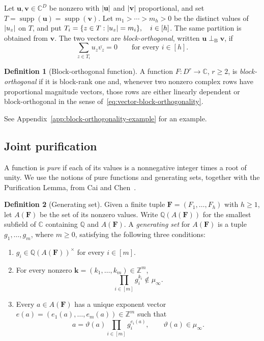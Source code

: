 \documentclass[11pt,letterpaper,onecolumn]{article}
\theoremstyle{plain}
\theoremstyle{definition}
\newtheorem{definition}[definition]{Definition}
\theoremstyle{remark}
\newcommand{\AlgNums}{\mathbb C}
\DeclareMathOperator{\supp}{supp}
\DeclarePairedDelimiter{\abs}{\lvert}{\rvert}
\begin{document}
Let $\mathbf u,\mathbf v\in\mathbb C^D$ be nonzero with $\abs{\mathbf u}$
and $\abs{\mathbf v}$ proportional, and set
$T=\supp(\mathbf u)=\supp(\mathbf v)$.  Let
$m_1>\cdots>m_h>0$ be the distinct values of $\abs{u_z}$ on $T$, and
put $T_i=\{z\in T:\abs{u_z}=m_i\},\quad i\in[h]$. The same partition is obtained from $\mathbf v$.  The two vectors are
\emph{block-orthogonal}, written
$\mathbf u\perp_{\mathrm B}\mathbf v$, if
\begin{equation}
  \sum_{z\in T_i}u_z\overline{v_z}=0
  \qquad\text{for every }i\in[h].
  \label{eq:vector-block-orthogonality}
\end{equation}

\begin{definition}[Block-orthogonal function]
\label{def:block-orthogonal-function}
A function $F:D^r\to\AlgNums$, $r\ge2$, is \emph{block-orthogonal} if it
is block-rank one and, whenever two nonzero complex rows have proportional
magnitude vectors, those rows are either linearly dependent or
block-orthogonal in the sense of~\eqref{eq:vector-block-orthogonality}.
\end{definition}

See Appendix~\ref{app:block-orthogonality-example} for an example.

\subsection{Joint purification}

A function is
\emph{pure} if each of its values is a nonnegative integer times a root of
unity.  We use the notions of pure functions and generating sets, together
with the Purification Lemma, from Cai and
Chen~\cite[Definitions~2--3 and Lemma~7]{CaiChen2017}.

\begin{definition}[Generating set]
\label{def:generating-set}
Given a finite tuple
$\mathbf F=(F_1,\ldots,F_h)$ with $h\ge1$, let $A(\mathbf F)$ be the set of
its nonzero values.  Write $\mathbb Q(A(\mathbf F))$ for the smallest
subfield of $\AlgNums$ containing $\mathbb Q$ and $A(\mathbf F)$.
A \emph{generating set} for $A(\mathbf F)$ is a tuple
$g_1,\ldots,g_m$, where $m\ge0$, satisfying the following three conditions:
\begin{enumerate}
  \item\label{item:generators-field}
        $g_i\in\mathbb Q(A(\mathbf F))^\times$ for every $i\in[m]$.
  \item\label{item:generators-independent}
        For every nonzero
        $\mathbf k=(k_1,\ldots,k_m)\in\mathbb Z^m$,
        \[
          \prod_{i\in[m]} g_i^{k_i}\notin\mu_\infty.
        \]
  \item Every $a\in A(\mathbf F)$ has a unique exponent vector
        $e(a)=(e_1(a),\ldots,e_m(a))\in\mathbb Z^m$ such that
\begin{equation}
  a=\vartheta(a)\prod_{i\in[m]} g_i^{e_i(a)},
  \qquad \vartheta(a)\in\mu_\infty.
  \label{eq:multiplicative-decomposition}
\end{equation}
\end{enumerate}
\end{definition}
\end{document}
